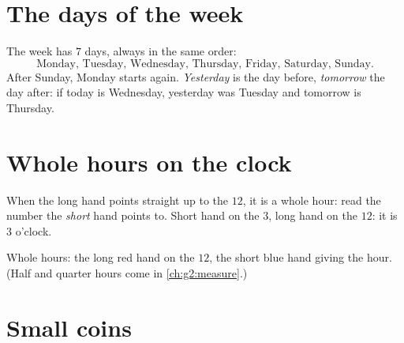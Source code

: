 \section{The days of the week}

\begin{example}\label{ex:g1:measure:days}
The week has $7$ days, always in the same order:
\[
\text{Monday, Tuesday, Wednesday, Thursday, Friday, Saturday,
Sunday.}
\]
After Sunday, Monday starts again. \emph{Yesterday} is the day
before, \emph{tomorrow} the day after: if today is Wednesday,
yesterday was Tuesday and tomorrow is Thursday.
\end{example}

\section{Whole hours on the clock}

\begin{method}\label{met:g1:measure:clock}
When the long hand points straight up to the $12$, it is a whole
hour: read the number the \emph{short} hand points to. Short hand on
the $3$, long hand on the $12$: it is $3$ o'clock.
\end{method}

\begin{omfigure}

{\small Whole hours: the long red hand on the $12$, the short blue
hand giving the hour. (Half and quarter hours come in
\cref{ch:g2:measure}.)}
\end{omfigure}

\section{Small coins}

